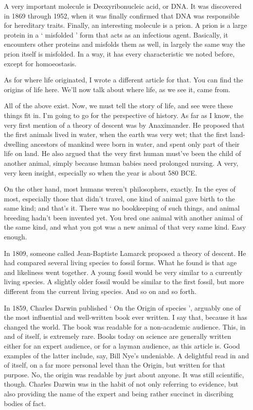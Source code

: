 \begin{multicols}{2}
A very important molecule is Deoxyribonucleic acid, or DNA. It was discovered in 1869 through 1952, when it was finally confirmed that DNA was responsible for hereditary traits. Finally, an interesting molecule is a prion. A prion is a large protein in a ‘ misfolded ’ form that acts as an infectious agent. Basically, it encounters other proteins and misfolds them as well, in largely the same way the prion itself is misfolded. In a way, it has every characteristic we noted before, except for homoeostasis.

As for where life originated, I wrote a different article for that. You can find the origins of life here. We'll now talk about where life, as we see it, came from.

All of the above exist. Now, we must tell the story of life, and see were these things fit in. I'm going to go for the perspective of history. As far as I know, the very first mention of a theory of descent was by Anaximander. He proposed that the first animals lived in water, when the earth was very wet; that the first land-dwelling ancestors of mankind were born in water, and spent only part of their life on land. He also argued that the very first human must've been the child of another animal, simply because human babies need prolonged nursing. A very, very keen insight, especially so when the year is about 580 BCE.

On the other hand, most humans weren't philosophers, exactly. In the eyes of most, especially those that didn't travel, one kind of animal gave birth to the same kind; and that's it. There was no bookkeeping of such things, and animal breeding hadn't been invented yet. You bred one animal with another animal of the same kind, and what you got was a new animal of that very same kind. Easy enough.

In 1809, someone called Jean-Baptiste Lamarck proposed a theory of descent. He had compared several living species to fossil forms. What he found is that age and likeliness went together. A young fossil would be very similar to a currently living species. A slightly older fossil would be similar to the first fossil, but more different from the current living species. And so on and so forth.

In 1859, Charles Darwin published ‘ On the Origin of species ’, arguably one of the most influential and well-written book ever written. I say that, because it has changed the world. The book was readable for a non-academic audience. This, in and of itself, is extremely rare. Books today on science are generally written either for an expert audience, or for a layman audience, as this article is. Good examples of the latter include, say, Bill Nye's undeniable. A delightful read in and of itself, on a far more personal level than the Origin, but written for that purpose. No, the origin was readable by just about anyone. It was still scientific, though. Charles Darwin was in the habit of not only referring to evidence, but also providing the name of the expert and being rather succinct in discribing bodies of fact.


\end{multicols}
